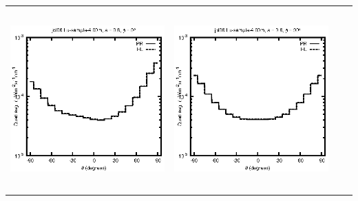 \begin{tabular}{c c c c}
\includegraphics[height=7cm]{../eps/jol06_Lu_sample_4.00m_fwd.eps} &
\includegraphics[height=7cm]{../eps/jol06_Lu_sample_4.00m_cross.eps} \\
\end{tabular}

\pagebreak

